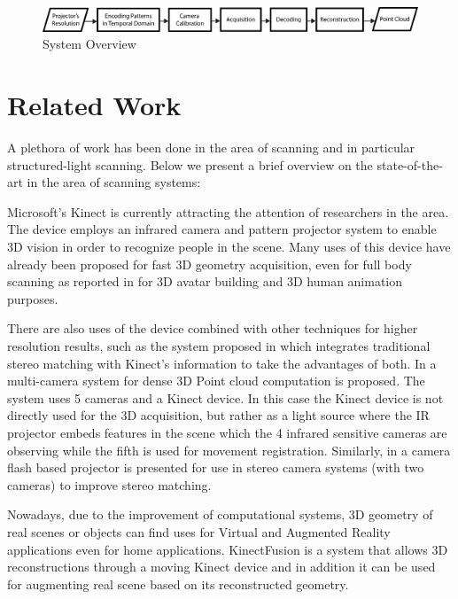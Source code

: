 \documentclass[final,12pt,3p]{elsarticle}
\begin{document}
\begin{figure}[!ht]
 \centering
 \includegraphics[scale=0.5]{./images/systemOverview.png}
 \caption{\label{fig:system_overview} System Overview}
\end{figure}

\section{Related Work}
\label{sec:related_work}
A plethora of work has been done in the area of scanning and in particular structured-light scanning. Below we present a brief overview on the state-of-the-art in the area of scanning systems:

Microsoft's Kinect\cite{smisek20133d} is currently attracting the attention of researchers in the area. The device employs an infrared camera and pattern projector system to enable 3D vision in order to recognize people in the scene. Many uses of this device have already been proposed for fast 3D geometry acquisition, even for full body scanning as reported in \cite{cui20113d} \cite{tong2012scanning} for 3D avatar building and 3D human animation purposes. 

There are also uses of the device combined with other techniques for higher resolution results, such as the system proposed in \cite{somanath2013stereo+} which integrates traditional stereo matching with Kinect's information to take the advantages of both.
In \cite{fritsch2012photogrammetric} a multi-camera system for dense 3D Point cloud computation is proposed. The system uses 5 cameras and a Kinect device. In this case the Kinect device is not directly used for the 3D acquisition, but rather as a light source where the IR projector embeds features in the scene which the 4 infrared sensitive cameras are observing while the fifth is used for movement registration. Similarly, in \cite{rohith2009camera} a camera flash based projector is presented for use in stereo camera systems (with two cameras) to improve stereo matching.

Nowadays, due to the improvement of computational systems, 3D geometry of real scenes or objects can find uses for Virtual and Augmented Reality applications even for home applications. KinectFusion \cite{izadi2011kinectfusion} is a system that allows 3D reconstructions through a moving Kinect device and in addition it can be used for augmenting real scene based on its reconstructed geometry.
\end{document}
